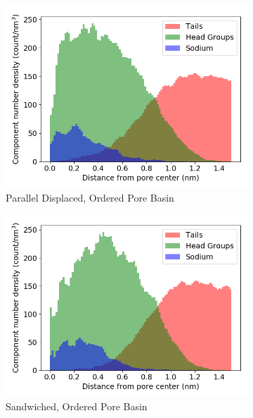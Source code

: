 \documentclass{article}
\begin{document}
  \begin{figure}
  \centering
  \begin{subfigure}{0.47\textwidth}
        \includegraphics[width=1\linewidth]{offset_density.png}
        \caption{Parallel Displaced, Ordered Pore Basin}
        \label{fig:offset_density}
  \end{subfigure}
  \begin{subfigure}{0.47\textwidth}
        \includegraphics[width=1\linewidth]{layered_density.png}
        \caption{Sandwiched, Ordered Pore Basin}
        \label{fig:layered_density}
  \end{subfigure}
  \begin{subfigure}{0.47\textwidth}

\end{subfigure}
\end{figure}
\end{document}
